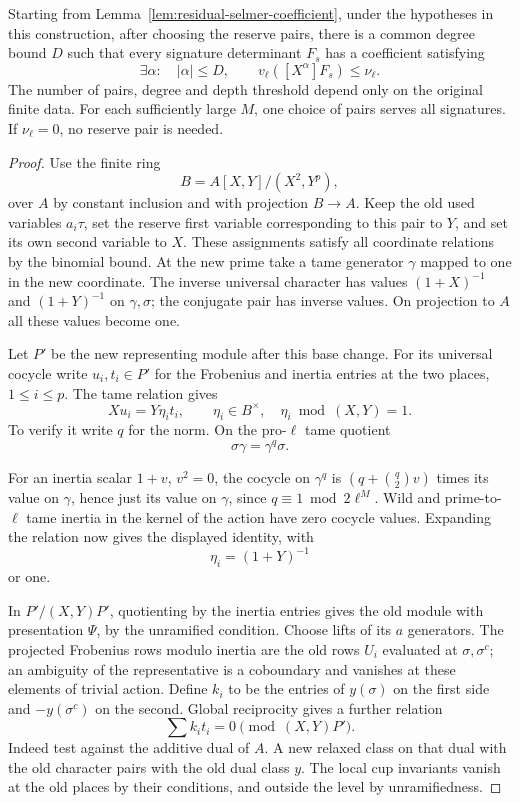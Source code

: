 \begin{proposition}\label{prop:positive-signature-determinant}
Starting from Lemma~\ref{lem:residual-selmer-coefficient},
under the hypotheses in this construction, after choosing the
reserve pairs, there is a common degree bound \(D\) such that every signature determinant \(F_s\) has a coefficient satisfying
\[
 \exists\alpha:\quad |\alpha|\le D,\qquad v_\ell([X^\alpha]F_s)\le\nu_\ell.
\] The number of pairs, degree and depth threshold depend
only on the original finite data. For each sufficiently large
\(M\), one choice of pairs serves all signatures. If
\(\nu_\ell=0\), no reserve pair is needed.
\end{proposition}

\begin{proof}
Use the finite ring
\[
 B=A[X,Y]/(X^2,Y^p),
\]
over \(A\) by
constant inclusion and with projection \(B\to A\).
Keep the old used variables \(a_i \tau\), set the reserve first
variable corresponding to this pair to \(Y\), and set its
own second variable to \(X\). These assignments satisfy all
coordinate relations by the binomial bound. At the new
prime take a tame generator \(\gamma\) mapped to one in the
new coordinate. The inverse universal character has values
\((1+X)^{-1}\) and \((1+Y)^{-1}\) on \(\gamma,\sigma\);
the conjugate pair has inverse values. On projection to \(A\)
all these values become one.

Let \(P'\) be the new representing module after this base
change. For its universal cocycle write \(u_i,t_i\in P'\)
for the Frobenius and inertia entries at the two places,
\(1\le i\le p\). The tame relation gives
\[
          X u_i=Y\eta_i t_i,\qquad
             \eta_i\in B^\times,\quad \eta_i\bmod(X,Y)=1 .
\]
To verify it write \(q\) for the norm. On the pro-\(\ell\)
tame quotient
\[
 \sigma\gamma=\gamma^q\sigma.
\]

For an inertia scalar \(1+v\), \(v^2=0\), the cocycle on
\(\gamma^q\) is \((q+\binom q2 v)\) times its value on
\(\gamma\), hence just its value on \(\gamma\), since
\(q\equiv1\bmod 2\ell^M\). Wild and prime-to-\(\ell\) tame
inertia in the kernel of the action have zero cocycle values.
Expanding the relation now gives the displayed identity,
with
\[
 \eta_i=(1+Y)^{-1}
\]
or one.

In \(P'/(X,Y)P'\), quotienting by the inertia entries gives
the old module with presentation \(\Psi\), by the unramified
condition. Choose lifts of its \(a\) generators. The projected
Frobenius rows modulo inertia are the old rows \(U_i\)
evaluated at \(\sigma,\sigma^c\); an ambiguity of the
representative is a coboundary and vanishes at these elements
of trivial action. Define \(k_i\) to be the entries of
\(y(\sigma)\) on the first side and \(-y(\sigma^c)\) on the
second. Global reciprocity gives a further relation
\[
                \sum k_i t_i=0 \pmod{(X,Y)P'} .
\]
Indeed test against the additive dual of \(A\). A new relaxed
class on that dual with the old character pairs with the old
dual class \(y\). The local cup invariants vanish at the old
places by their conditions, and outside the level by
unramifiedness.


\end{proof}
